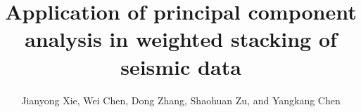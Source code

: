 

\title{Application of principal component analysis in weighted stacking of seismic data}
\renewcommand{\thefootnote}{\fnsymbol{footnote}}

\author{Jianyong Xie\footnotemark[1], Wei Chen\footnotemark[2], Dong Zhang\footnotemark[1], Shaohuan Zu\footnotemark[1], and Yangkang Chen\footnotemark[3]}

\address{
\footnotemark[1]
State Key Laboratory of Petroleum Resources and Prospecting \\
China University of Petroleum \\
Fuxue Road 18th\\
Beijing, China, 102200 \\
gsw19900128@126.com\\
\footnotemark[2]
Key Laboratory of Exploration Technology for Oil and Gas Resources of Ministry of Education, Yangtze University, Wuhan, Hubei, China, 430100, Hubei Cooperative Innovation Center of Unconventional Oil and Gas, Wuhan, Hubei, China, 430100, and State Key Laboratory of Geodesy and Earth's Dynamics, Institute of Geodesy and Geophysics, Chinese Academy of Sciences, Wuhan, China, 430077, chenwei2014@yangtzeu.edu.cn.\\
gsw19900128@126.com\\
\footnotemark[3] Jackson School of Geosciences\\
The University of Texas at Austin\\
University Station, Box X\\
Austin, TX 78713-8924, USA \\
Email: ykchen@utexas.edu\\
}

\DeclareRobustCommand{\dlo}[1]{}
\DeclareRobustCommand{\wen}[1]{#1}

\maketitle

